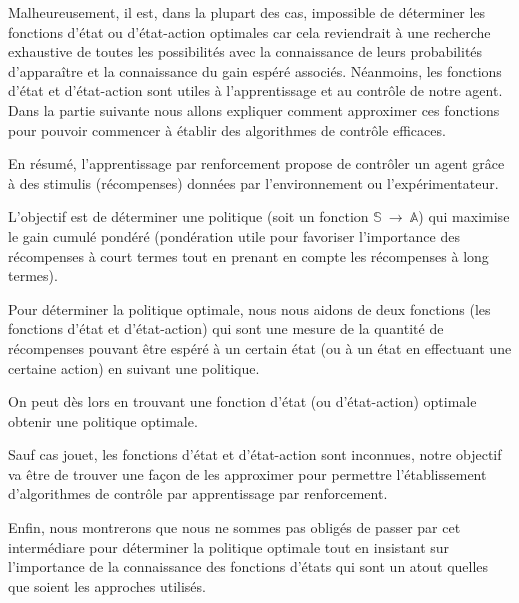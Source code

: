 Malheureusement, il est, dans la plupart des cas, impossible de déterminer les fonctions d'état ou d'état-action optimales car cela reviendrait à une recherche exhaustive de toutes les possibilités avec la connaissance de leurs probabilités d'apparaître et la connaissance du gain espéré associés. Néanmoins, les fonctions d'état et d'état-action sont utiles à l'apprentissage et au contrôle de notre agent. Dans la partie suivante nous allons expliquer comment approximer ces fonctions pour pouvoir commencer à établir des algorithmes de contrôle efficaces.

En résumé, l'apprentissage par renforcement propose de contrôler un agent grâce à des stimulis (récompenses) données par l'environnement ou l'expérimentateur. 

L'objectif est de déterminer une politique (soit un fonction $\mathbb{S} \: \rightarrow \: \mathbb{A}$) qui maximise le gain cumulé pondéré (pondération utile pour favoriser l'importance des récompenses à court termes tout en prenant en compte les récompenses à long termes).


Pour déterminer la politique optimale, nous nous aidons de deux fonctions (les fonctions d'état et d'état-action) qui sont une mesure de la quantité de récompenses pouvant être espéré à un certain état (ou à un état en effectuant une certaine action) en suivant une politique. 

On peut dès lors en trouvant une fonction d'état (ou d'état-action) optimale obtenir une politique optimale. 

Sauf cas jouet, les fonctions d'état et d'état-action sont inconnues, notre objectif va être de trouver une façon de les approximer pour permettre l'établissement d'algorithmes de contrôle par apprentissage par renforcement.


Enfin, nous montrerons que nous ne sommes pas obligés de passer par cet intermédiare pour déterminer la politique optimale tout en insistant sur l'importance de la connaissance des fonctions d'états qui sont un atout quelles que soient les approches utilisés.
